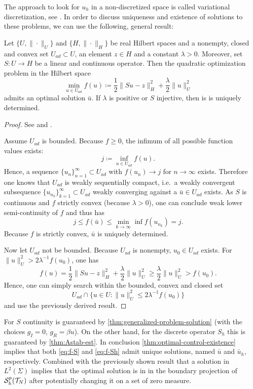 \documentclass[../thesis.tex]{subfiles}
\begin{document}
The approach to look for $u_h$ in a non-discretized space is called variational discretization, see \cite{Hinze}.
In order to discuss uniqueness and existence of solutions to these problems, we can use the following, general result:
\begin{theorem}
\label{thm:optimal-control-existence}
Let $\{ U, \| \cdot \|_U \}$ and $\{ H, \| \cdot \|_H \}$ be real Hilbert spaces and a nonempty, closed and convex set $U_{ad} \subset U$, an element $z \in H$ and a constant $\lambda > 0$.
Moreover, set $S : U \to H$ be a linear and continuous operator.
Then the quadratic optimization problem in the Hilbert space
\[
	\min_{u \in U_{ad}} f(u) \coloneqq \frac{1}{2} \| Su - z \|_H^2 + \frac{\lambda}{2} \| u \|_U^2
\]
admits an optimal solution $\bar{u}$. If $\lambda$ is positive or $S$ injective, then is is uniquely determined.
\end{theorem}
\begin{proof}
See \cite[Satz 2.14]{Troeltzsch} and \cite[Satz 2.15]{Troeltzsch}.

Assume $U_{ad}$ is bounded. Because $f \geq 0$, the infimum of all possible function values exists:
\[
	j \coloneqq \inf_{u \in U_{ad}} f(u).
\]
Hence, a sequence $\{ u_n \}_{n=1}^\infty \subset U_{ad}$ with $f(u_n) \to j$ for $n \to \infty$ exists.
Therefore one knows that $U_{ad}$ is weakly sequentially compact, i.e.\ a weakly convergent subsequence $\{ u_{n_k} \}_{k=1}^\infty \subset U_{ad}$ weakly converging against a $\bar{u} \in U_{ad}$ exists.
As $S$ is continuous and $f$ strictly convex (because $\lambda > 0$), one can conclude weak lower semi-continuity of $f$ and thus has
\[
	j \leq f(\bar{u}) \leq \min_{k \to \infty} \inf f(u_{n_k}) = j.
\]
Because $f$ is strictly convex, $\bar{u}$ is uniquely determined.

Now let $U_{ad}$ not be bounded. Because $U_{ad}$ is nonempty, $u_0 \in U_{ad}$ exists. For $\| u \|_U^2 > 2 \lambda^{-1} f(u_0)$, one has
\[
	f(u) = \frac{1}{2} \| S u - z \|_H^2 + \frac{\lambda}{2} \| u \|_U^2 \geq \frac{\lambda}{2} \| u \|_U^2 > f(u_0).
\]
Hence, one can simply search within the bounded, convex and closed set
\[
	U_{ad} \cap \{ u \in U : \| u \|_U^2 \leq 2 \lambda^{-1} f(u_0) \}
\]
and use the previously derived result.
\end{proof}
For $S$ continuity is guaranteed by \cref{thm:generalized-problem-solution} (with the choices $g_I = 0$, $g_R = \beta u$).
On the other hand, for the discrete operator $S_h$ this is guaranteed by \cref{thm:Astab-est}.
In conclusion \cref{thm:optimal-control-existence} implies that both \cref{eq:f-S} and \cref{eq:f-Sh} admit unique solutions, named $\bar{u}$ and $\bar{u}_h$, respectively.
Combined with the previously shown result that a solution in $L^2(\Sigma)$ implies that the optimal solution is in in the boundary projection of $\mathcal{S}_h^p(\mathcal{T}_N)$ after potentially changing it on a set of zero measure.
\end{document}
